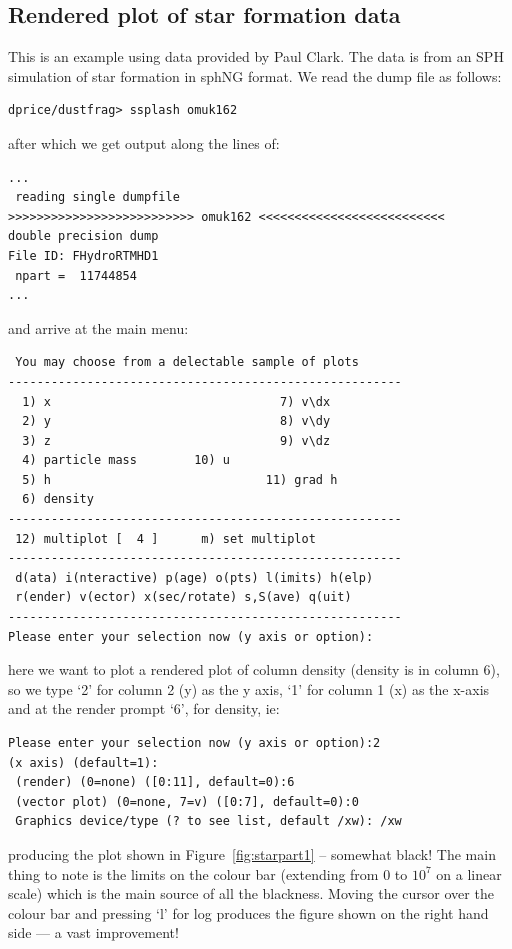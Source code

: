 \documentclass[a4paper,11pt]{article}
\begin{document}
\subsection{Rendered plot of star formation data}
 This is an example using data provided by Paul Clark. The data is from an SPH simulation of star formation in sphNG format. We read the dump file as follows:
\begin{verbatim}
dprice/dustfrag> ssplash omuk162
\end{verbatim}
after which we get output along the lines of:
\begin{verbatim}
...
 reading single dumpfile
>>>>>>>>>>>>>>>>>>>>>>>>>> omuk162 <<<<<<<<<<<<<<<<<<<<<<<<<<
double precision dump
File ID: FHydroRTMHD1
 npart =  11744854
...
\end{verbatim}
and arrive at the main menu:
\begin{verbatim}
 You may choose from a delectable sample of plots 
-------------------------------------------------------
  1) x                                7) v\dx                
  2) y                                8) v\dy                
  3) z                                9) v\dz                
  4) particle mass        10) u                   
  5) h                              11) grad h              
  6) density             
-------------------------------------------------------
 12) multiplot [  4 ]      m) set multiplot 
-------------------------------------------------------
 d(ata) i(nteractive) p(age) o(pts) l(imits) h(elp)
 r(ender) v(ector) x(sec/rotate) s,S(ave) q(uit)
-------------------------------------------------------
Please enter your selection now (y axis or option):
\end{verbatim}
here we want to plot a rendered plot of column density (density is in column 6), so we type `2' for column 2 (y) as the y axis, `1' for column 1 (x) as the x-axis and at the render prompt `6', for density, ie:
\begin{verbatim}
Please enter your selection now (y axis or option):2
(x axis) (default=1):
 (render) (0=none) ([0:11], default=0):6
 (vector plot) (0=none, 7=v) ([0:7], default=0):0
 Graphics device/type (? to see list, default /xw): /xw
\end{verbatim}
producing the plot shown in Figure~\ref{fig:starpart1} -- somewhat black! The main thing to note is the limits on the colour bar (extending from $0$ to $10^{7}$ on a linear scale) which is the main source of all the blackness. Moving the cursor over the colour bar and pressing `l' for log produces the figure shown on the right hand side --- a vast improvement!
\end{document}
